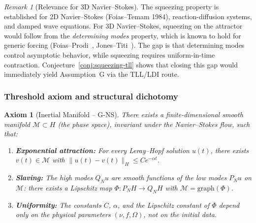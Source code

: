 \documentclass[12pt,a4paper]{article}
\theoremstyle{definition}
\theoremstyle{plain}
\newtheorem{axiom}[definition]{Axiom}
\theoremstyle{remark}
\newtheorem{remark}[definition]{Remark}
\begin{document}
\begin{remark}[Relevance for 3D Navier--Stokes]\label{rem:squeezing-ns}
The squeezing property is established for 2D Navier--Stokes (Foias--Temam 1984), reaction-diffusion systems, and damped wave equations. For 3D Navier--Stokes, squeezing on the attractor would follow from the \emph{determining modes} property, which is known to hold for generic forcing (Foias--Prodi~\cite{FoiasProdi1967}, Jones--Titi~\cite{JonesTiti1992}). The gap is that determining modes control asymptotic behavior, while squeezing requires uniform-in-time contraction. Conjecture~\ref{conj:squeezing-tll} shows that closing this gap would immediately yield Assumption~G via the TLL/LDI route.
\end{remark}

\subsubsection*{Threshold axiom and structural dichotomy}

\begin{axiom}[Inertial Manifold -- G-NS]\label{ax:g-ns}
There exists a finite-dimensional smooth manifold $\mathcal{M} \subset H$ (the phase space), invariant under the Navier--Stokes flow, such that:
\begin{enumerate}
\item[(G1)] \textbf{Exponential attraction:} For every Leray--Hopf solution $u(t)$, there exists $v(t) \in \mathcal{M}$ with $\|u(t) - v(t)\|_H \leq C e^{-\alpha t}$.
\item[(G2)] \textbf{Slaving:} The high modes $Q_N u$ are smooth functions of the low modes $P_N u$ on $\mathcal{M}$: there exists a Lipschitz map $\Phi: P_N H \to Q_N H$ with $\mathcal{M} = \mathrm{graph}(\Phi)$.
\item[(G3)] \textbf{Uniformity:} The constants $C$, $\alpha$, and the Lipschitz constant of $\Phi$ depend only on the physical parameters $(\nu, f, \Omega)$, not on the initial data.
\end{enumerate}
\end{axiom}
\end{document}
